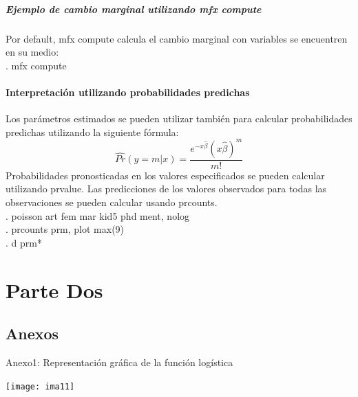 \documentclass[11pt,fleqn]{book} %
\numberwithin{equation}{section} %
\numberwithin{figure}{section} %
\numberwithin{table}{section} %
\begin{document}
\subsubsection {Ejemplo de cambio marginal utilizando mfx compute}
Por default, mfx compute calcula el cambio marginal con variables se encuentren en su medio:\\
. mfx compute\\

\subsection{Interpretación utilizando probabilidades predichas}
Los parámetros estimados se pueden utilizar también para calcular probabilidades predichas utilizando la siguiente fórmula:
\begin{equation}
\widehat{Pr}(y =m| x) =\frac{{e}^{-x \widehat{\beta}}({{x \widehat{\beta}}})^{m }}{m!}
\end{equation}
Probabilidades pronosticadas en los valores especificados se pueden calcular utilizando prvalue. Las predicciones de los valores observados  para todas las observaciones se pueden calcular usando prcounts.\\
. poisson art fem mar kid5 phd ment, nolog\\
. prcounts prm, plot max(9)\\
. d prm*\\




\part{Parte Dos}




\chapter*{Anexos}

Anexo1: Representación gráfica de la función logística
\begin{center}
\texttt{[image: ima11]}
\end{center}
\end{document}
